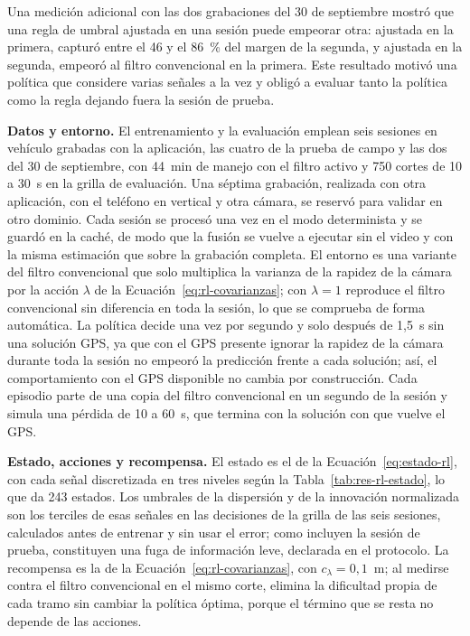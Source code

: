 Una medición adicional con las dos grabaciones del 30 de septiembre mostró que una regla de umbral ajustada en una sesión puede empeorar otra: ajustada en la primera, capturó entre el 46 y el 86~\% del margen de la segunda, y ajustada en la segunda, empeoró al filtro convencional en la primera.
Este resultado motivó una política que considere varias señales a la vez y obligó a evaluar tanto la política como la regla dejando fuera la sesión de prueba.

\textbf{Datos y entorno.}
El entrenamiento y la evaluación emplean seis sesiones en vehículo grabadas con la aplicación, las cuatro de la prueba de campo y las dos del 30 de septiembre, con 44~min de manejo con el filtro activo y 750 cortes de 10 a 30~s en la grilla de evaluación.
Una séptima grabación, realizada con otra aplicación, con el teléfono en vertical y otra cámara, se reservó para validar en otro dominio.
Cada sesión se procesó una vez en el modo determinista y se guardó en la caché, de modo que la fusión se vuelve a ejecutar sin el video y con la misma estimación que sobre la grabación completa.
El entorno es una variante del filtro convencional que solo multiplica la varianza de la rapidez de la cámara por la acción $\lambda$ de la Ecuación~\eqref{eq:rl-covarianzas}; con $\lambda = 1$ reproduce el filtro convencional sin diferencia en toda la sesión, lo que se comprueba de forma automática.
La política decide una vez por segundo y solo después de 1,5~s sin una solución GPS, ya que con el GPS presente ignorar la rapidez de la cámara durante toda la sesión no empeoró la predicción frente a cada solución; así, el comportamiento con el GPS disponible no cambia por construcción.
Cada episodio parte de una copia del filtro convencional en un segundo de la sesión y simula una pérdida de 10 a 60~s, que termina con la solución con que vuelve el GPS.

\textbf{Estado, acciones y recompensa.}
El estado es el de la Ecuación~\eqref{eq:estado-rl}, con cada señal discretizada en tres niveles según la Tabla~\ref{tab:res-rl-estado}, lo que da 243 estados.
Los umbrales de la dispersión y de la innovación normalizada son los terciles de esas señales en las decisiones de la grilla de las seis sesiones, calculados antes de entrenar y sin usar el error; como incluyen la sesión de prueba, constituyen una fuga de información leve, declarada en el protocolo.
La recompensa es la de la Ecuación~\eqref{eq:rl-covarianzas}, con $c_{\lambda} = 0{,}1$~m; al medirse contra el filtro convencional en el mismo corte, elimina la dificultad propia de cada tramo sin cambiar la política óptima, porque el término que se resta no depende de las acciones.

